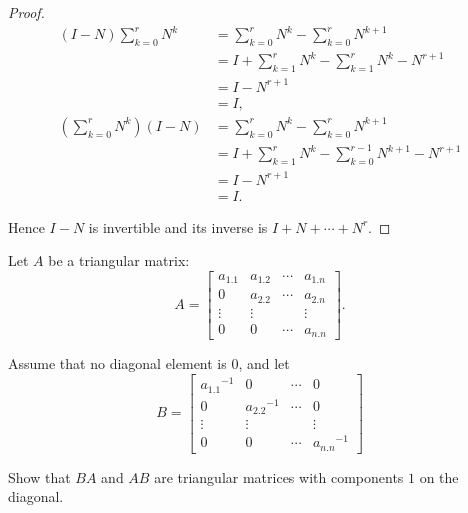 \begin{proof}
    \begin{align*}
        (I - N)\sum^{r}_{k=0}N^{k}              & = \sum^{r}_{k=0}N^{k} - \sum^{r}_{k=0}N^{k+1}                 \\
                                                & = I + \sum^{r}_{k=1}N^{k} - \sum^{r}_{k=1}N^{k} - N^{r+1}     \\
                                                & = I - N^{r+1}                                                 \\
                                                & = I,                                                          \\
        \left(\sum^{r}_{k=0}N^{k}\right)(I - N) & = \sum^{r}_{k=0}N^{k} - \sum^{r}_{k=0}N^{k+1}                 \\
                                                & = I + \sum^{r}_{k=1}N^{k} - \sum^{r-1}_{k=0}N^{k+1} - N^{r+1} \\
                                                & = I - N^{r+1}                                                 \\
                                                & = I.
    \end{align*}

    Hence $I - N$ is invertible and its inverse is $I + N + \cdots + N^{r}$.
\end{proof}

\begin{exercise}
    Let $A$ be a triangular matrix:
    \[
        A = \begin{bmatrix}
            a_{1.1} & a_{1.2} & \cdots & a_{1.n} \\
            0       & a_{2.2} & \cdots & a_{2.n} \\
            \vdots  & \vdots  &        & \vdots  \\
            0       & 0       & \cdots & a_{n.n}
        \end{bmatrix}.
    \]

    Assume that no diagonal element is $0$, and let
    \[
        B = \begin{bmatrix}
            {a_{1.1}}^{-1} & 0              & \cdots & 0              \\
            0              & {a_{2.2}}^{-1} & \cdots & 0              \\
            \vdots         & \vdots         &        & \vdots         \\
            0              & 0              & \cdots & {a_{n.n}}^{-1}
        \end{bmatrix}
    \]

    Show that $BA$ and $AB$ are triangular matrices with components $1$ on the diagonal.
\end{exercise}

